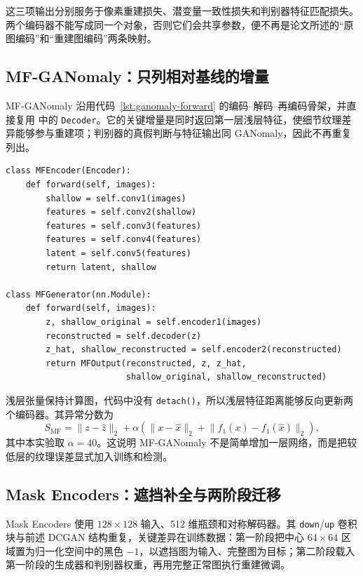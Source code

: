\documentclass[UTF8,12pt]{ctexart}
\begin{document}
这三项输出分别服务于像素重建损失、潜变量一致性损失和判别器特征匹配损失。两个编码器不能写成同一个对象，否则它们会共享参数，便不再是论文所述的“原图编码”和“重建图编码”两条映射。

\subsection{MF-GANomaly：只列相对基线的增量}

MF-GANomaly 沿用代码~\ref{lst:ganomaly-forward} 的编码--解码--再编码骨架，并直接复用  中的 \texttt{Decoder}。它的关键增量是同时返回第一层浅层特征，使细节纹理差异能够参与重建项；判别器的真假判断与特征输出同 GANomaly，因此不再重复列出。

\begin{lstlisting}[style=pythonstyle,caption={MF-GANomaly 暴露浅层特征并组成五项输出},label={lst:mf-forward}]
class MFEncoder(Encoder):
    def forward(self, images):
        shallow = self.conv1(images)
        features = self.conv2(shallow)
        features = self.conv3(features)
        features = self.conv4(features)
        latent = self.conv5(features)
        return latent, shallow

class MFGenerator(nn.Module):
    def forward(self, images):
        z, shallow_original = self.encoder1(images)
        reconstructed = self.decoder(z)
        z_hat, shallow_reconstructed = self.encoder2(reconstructed)
        return MFOutput(reconstructed, z, z_hat,
                        shallow_original, shallow_reconstructed)
\end{lstlisting}

浅层张量保持计算图，代码中没有 \texttt{detach()}，所以浅层特征距离能够反向更新两个编码器。其异常分数为
\begin{equation}
S_{\mathrm{MF}}=\lVert z-\hat z\rVert_2+\alpha\left(\lVert x-\hat x\rVert_2+\lVert f_1(x)-f_1(\hat x)\rVert_2\right),
\end{equation}
其中本实验取 $\alpha=40$。这说明 MF-GANomaly 不是简单增加一层网络，而是把较低层的纹理误差显式加入训练和检测。

\subsection{Mask Encoders：遮挡补全与两阶段迁移}

Mask Encoders 使用 $128\times128$ 输入、512 维瓶颈和对称解码器。其 \texttt{down}/\texttt{up} 卷积块与前述 DCGAN 结构重复，关键差异在训练数据：第一阶段把中心 $64\times64$ 区域置为归一化空间中的黑色 $-1$，以遮挡图为输入、完整图为目标；第二阶段载入第一阶段的生成器和判别器权重，再用完整正常图执行重建微调。
\end{document}
